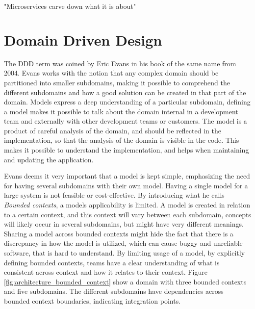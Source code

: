 "Microservices carve down what it is about"


\section{Domain Driven Design}
The DDD term was coined by Eric Evans in his book of the same name from 2004\cite[preface]{evans2004domain}. Evans works with the notion that any complex domain should be partitioned into smaller subdomains, making it possible to comprehend the different subdomains and how a good solution can be created in that part of the domain. Models express a deep understanding of a particular subdomain, defining a model makes it possible to talk about the domain internal in a development team and externally with other development teams or customers. The model is a product of careful analysis of the domain, and should be reflected in the implementation, so that the analysis of the domain is visible in the code. This makes it possible to understand the implementation, and helps when maintaining and updating the application\cite[p.~2]{evans2004domain}.

Evans deems it very important that a model is kept simple, emphasizing the need for having several subdomains with their own model. Having a single model for a large system is not feasible or cost-effective\cite[p.~331]{evans2004domain}. By introducing what he calls \textit{Bounded contexts}, a models applicability is limited. A model is created in relation to a certain context, and this context will vary between each subdomain, concepts will likely occur in several subdomains, but might have very different meanings. Sharing a model across bounded contexts might hide the fact that there is a discrepancy in how the model is utilized, which can cause buggy and unreliable software, that is hard to understand. By limiting usage of a model, by explicitly defining bounded contexts, teams have a clear understanding of what is consistent across context and how it relates to their context\cite[p.~331]{evans2004domain}. Figure \ref{fig:architecture_bounded_context} show a domain with three bounded contexts and five subdomains. The different subdomains have dependencies across bounded context boundaries, indicating integration points.

